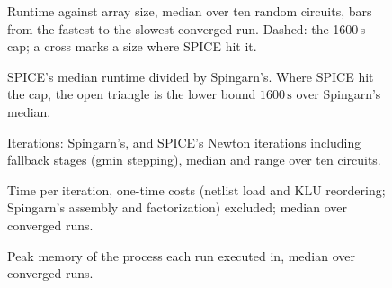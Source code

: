 \documentclass[11pt]{article}
\begin{document}
\begin{table}[p]
  \centering\small
  
  \caption{Median runtime (s) over ten circuits, and SPICE's median over Spingarn's (ratio $> 1$: Spingarn faster).
  A superscript $k/m$: only $k$ of the $m$ runs converged (a run stopped at the 1600\,s cap counts as slower than all
  converged runs in the median). $>$1600: the run hit the cap. --: not run.}
\end{table}

\begin{table}[p]
  \centering\small
  
  \caption{Median iterations over ten circuits: Spingarn's, and SPICE's Newton iterations including fallback stages
  (gmin stepping). t/o: the run hit the 1600\,s cap.}
\end{table}

\begin{figure}[p]
  \centering
  
  \caption{Runtime against array size, median over ten random circuits, bars from the fastest to the slowest
  converged run. Dashed: the 1600\,s cap; a cross marks a size where SPICE hit it.}
\end{figure}

\begin{figure}[p]
  \centering
  
  \caption{SPICE's median runtime divided by Spingarn's. Where SPICE hit the cap, the open triangle is the lower bound
  $1600\,\mathrm{s}$ over Spingarn's median.}
\end{figure}

\begin{figure}[p]
  \centering
  
  \caption{Iterations: Spingarn's, and SPICE's Newton iterations including fallback stages (gmin stepping), median
  and range over ten circuits.}
\end{figure}

\begin{figure}[p]
  \centering
  
  \caption{Time per iteration, one-time costs (netlist load and KLU reordering; Spingarn's assembly and
  factorization) excluded; median over converged runs.}
\end{figure}

\begin{figure}[p]
  \centering
  
  \caption{Peak memory of the process each run executed in, median over converged runs.}
\end{figure}
\end{document}
